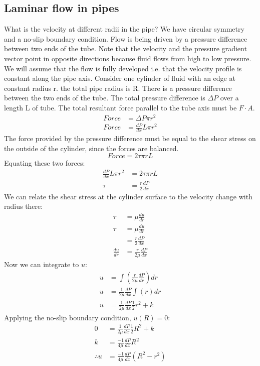 \documentclass[class=report, crop=false, 12pt,a4paper]{standalone}
\begin{document}
\subsection{Laminar flow in pipes}
What is the velocity at different radii in the pipe? We have circular symmetry and a no-slip boundary condition. Flow is being driven by a pressure difference between two ends of the tube. Note that the velocity and the pressure gradient vector point in opposite directions because fluid flows from high to low pressure. We will assume that the flow is fully developed i.e. that the velocity profile is constant along the pipe axis. Consider one cylinder of fluid with an edge at constant radius r. the total pipe radius is R. There is a pressure difference between the two ends of the tube. The total pressure difference is \(\Delta P\) over a length L of tube. The total resultant force parallel to the tube axis must be \(F\cdot A\).
\begin{align*}
  Force &= \Delta P \pi r^2\\
  Force &= \frac{dP}{dx}L\pi r^2
\end{align*}
The force provided by the pressure difference must be equal to the shear stress on the outside of the cylinder, since the forces are balanced.
\[ Force = 2\tau \pi r L \]
Equating these two forces:
\begin{align*}
  \frac{dP}{dx}L\pi r^2 &= 2\tau \pi r L\\
  \tau &= \frac{r}{2} \frac{dP}{dx}
\end{align*}
We can relate the shear stress at the cylinder surface to the velocity change with radius there:
\begin{align*}
  \tau &= \mu \frac{du}{dr}\\
  \tau &= \mu \frac{du}{dr}\\
  &= \frac{r}{2} \frac{dP}{dx}\\
  \frac{du}{dr} &= \frac{r}{2\mu} \frac{dP}{dx}
\end{align*}
Now we can integrate to \(u\):
\begin{align*}
  u &= \int \left( \frac{r}{2\mu} \frac{dP}{dr} \right) dr\\
  u &= \frac{1}{2\mu} \frac{dP}{dx} \int (r) dr\\
  u &= \frac{1}{2\mu} \frac{dP}{dx} \frac{1}{2}r^2 +k
\end{align*}
Applying the no-slip boundary condition, \( u(R) = 0\):
\begin{align*}
  0 &= \frac{1}{2\mu} \frac{dP}{dx} \frac{1}{2} R^2 + k\\
  k &= \frac{-1}{4\mu} \frac{dP}{dx} R^2 \\
  \therefore u &= \frac{-1}{4\mu}\frac{dP}{dx}(R^2 - r^2)
\end{align*}
\end{document}
